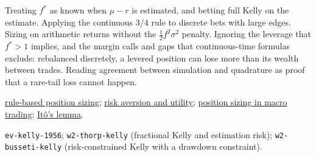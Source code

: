 \begin{qfresult}
 Treating $f^*$ as known when $\mu-r$ is estimated, and betting full Kelly on the estimate. Applying the continuous 3/4 rule to discrete bets with large edges. Sizing on arithmetic returns without the $\tfrac12f^2\sigma^2$ penalty. Ignoring the leverage that $f^*>1$ implies, and the margin calls and gaps that continuous-time formulas exclude: rebalanced discretely, a levered position can lose more than its wealth between trades. Reading agreement between simulation and quadrature as proof that a rare-tail loss cannot happen.

 \hyperref[meth:rule-based-position-sizing]{rule-based position sizing}; \hyperref[def:risk-aversion-utility]{risk aversion and utility}; \hyperref[meth:macro-position-sizing-risk]{position sizing in macro trading}; \hyperref[res:ito-lemma-geometric-brownian-motion]{It\^o's lemma}.

 \nolinkurl{ev-kelly-1956}; \nolinkurl{w2-thorp-kelly} (fractional Kelly and estimation risk); \nolinkurl{w2-busseti-kelly} (risk-constrained Kelly with a drawdown constraint).

\end{qfresult}

